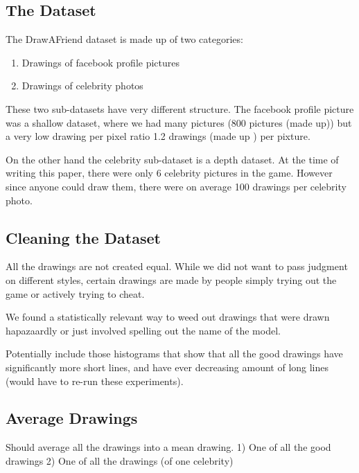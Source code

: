 \subsection{The Dataset}
The DrawAFriend dataset is made up of two categories:
\begin{enumerate}
\item Drawings of facebook profile pictures
\item Drawings of celebrity photos
\end{enumerate}

These two sub-datasets have very different structure. The facebook profile picture was a shallow dataset, where we had many pictures (800 pictures (made up)) but a very low drawing per pixel ratio 1.2 drawings (made up ) per pixture. 

On the other hand the celebrity sub-dataset is a depth dataset. At the time of writing this paper, there were only 6 celebrity pictures in the game. However since anyone could draw them, there were on average 100 drawings per celebrity photo.

\subsection{Cleaning the Dataset}
All the drawings are not created equal. While we did not want to pass judgment on different styles, certain drawings are made by people simply trying out the game or actively trying to cheat.

We found a statistically relevant way to weed out drawings that were drawn hapazaardly or just involved spelling out the name of the model.

Potentially include those histograms that show that all the good drawings have significantly more short lines, and have ever decreasing amount of long lines (would have to re-run these experiments).

\subsection{Average Drawings}
Should average all the drawings into a mean drawing.
1) One of all the good drawings
2) One of all the drawings (of one celebrity)